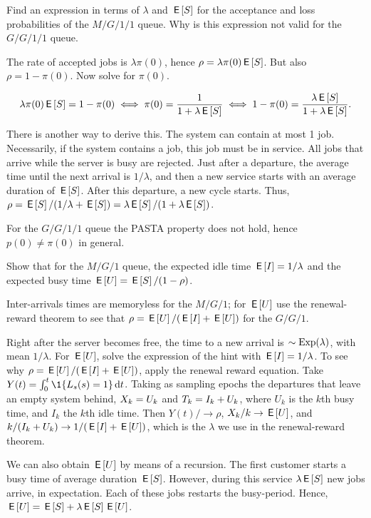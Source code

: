 \begin{exercise}
Find an expression in terms of $\lambda$ and $\,\mathsf{E}\left[S\right]$ for the acceptance and loss probabilities of  the $M/G/1/1$ queue.
Why is this expression not valid for the $G/G/1/1$ queue.
\begin{hint}
 The rate of accepted jobs is $\lambda \pi(0)$, hence $\rho= \lambda \pi(0) \,\mathsf{E}\left[S\right]$.
But also $\rho = 1-\pi(0)$.  Now solve for $\pi(0)$.
\end{hint}
\begin{solution}
 \begin{equation*}
 \lambda\pi(0) \,\mathsf{E}\left[S\right] = 1 - \pi(0) \iff \pi(0)=\frac1{1+\lambda\,\mathsf{E}\left[S\right]}
\iff 1-\pi(0) = \frac{\lambda \,\mathsf{E}\left[S\right]}{1+\lambda \,\mathsf{E}\left[S\right]}.
 \end{equation*}

 There is another way to derive this.
 The system can contain at most 1 job.
 Necessarily, if the system contains a job, this job must be in service.
 All jobs that arrive while the server is busy are rejected.
 Just after a departure, the average time until the next arrival is $1/\lambda$, and then a new service starts with an average duration of $\,\mathsf{E}\left[S\right]$.
 After this departure, a new cycle starts.
 Thus, $\rho = \,\mathsf{E}\left[S\right]/(1/\lambda + \,\mathsf{E}\left[S\right]) = \lambda \,\mathsf{E}\left[S\right]/ (1 + \lambda \,\mathsf{E}\left[S\right])$.


For the $G/G/1/1$ queue the PASTA property does not hold, hence $p(0)\neq \pi(0)$ in general.
\end{solution}
\end{exercise}


\begin{exercise}\label{ex:57}
 Show that for the $M/G/1$ queue, the expected idle time
 $\,\mathsf{E}\left[I\right] = 1/\lambda$ and the expected busy time $\,\mathsf{E}\left[U\right] = \,\mathsf{E}\left[S\right]/(1-\rho)$.
\begin{hint}
 Inter-arrivals times  are memoryless for the $M/G/1$; for $\,\mathsf{E}\left[U\right]$ use the renewal-reward theorem to see that  $\rho = \,\mathsf{E}\left[U\right]/(\,\mathsf{E}\left[I\right] + \,\mathsf{E}\left[U\right])$ for the $G/G/1$.
\end{hint}
\begin{solution}
  Right after the server becomes free, the time to a new arrival is $\sim\operatorname{Exp}(\lambda)$, with mean $1/\lambda$.
  For $\,\mathsf{E}\left[U\right]$, solve the expression of the hint with $\,\mathsf{E}\left[I\right] = 1/\lambda$.
  To see why $\rho = \,\mathsf{E}\left[U\right]/(\,\mathsf{E}\left[I\right] + \,\mathsf{E}\left[U\right])$, apply the renewal reward equation.
  Take $Y(t) = \int_0^t \1{\Ls(s)=1} \d t$.
  Taking as sampling epochs the departures that leave an empty system behind, $X_k = U_k$ and $T_k = I_k + U_k$, where $U_k$ is the $k$th busy time, and $I_k$ the $k$th idle time.
Then $Y(t)/\to\rho$, $X_k/k \to \,\mathsf{E}\left[U\right]$, and $k/(I_k + U_k) \to 1/(\,\mathsf{E}\left[I\right] + \,\mathsf{E}\left[U\right])$, which is the $\lambda$ we use in the renewal-reward theorem.

We can also obtain $\,\mathsf{E}\left[U\right]$ by means of a recursion. The first customer starts a busy time of average duration $\,\mathsf{E}\left[S\right]$. However, during this service $\lambda \,\mathsf{E}\left[S\right]$ new jobs arrive, in expectation. Each of these jobs restarts the busy-period. Hence, $\,\mathsf{E}\left[U\right] = \,\mathsf{E}\left[S\right] + \lambda \,\mathsf{E}\left[S\right] \,\mathsf{E}\left[U\right]$.
\end{solution}
\end{exercise}



